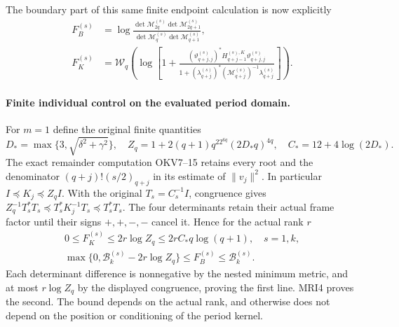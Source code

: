 \documentclass[11pt,a4paper]{article}
\begin{document}
The boundary part of this same finite endpoint calculation is
now explicitly
\[
\begin{split}
 F_B^{(s)}
 &=\log\frac{\det\mathcal M_{2q}^{(s)}
                  \det\mathcal M_{2q+1}^{(s)}}
                 {\det\mathcal M_q^{(s)}
                  \det\mathcal M_{q+1}^{(s)}},\\
 F_K^{(s)}
 &=\mathcal W_q\left(\log\left[1+
       \frac{(\vartheta_{q+j,j}^{(s)})^*
                H_{q+j-1}^{(s),K}\vartheta_{q+j,j}^{(s)}}
            {1+(\lambda_{q+j}^{(s)})^*
                (\mathcal M_{q+j}^{(s)})^{-1}\lambda_{q+j}^{(s)}}
                                    \right]\right).
\end{split}\tag{MRI4a}
\]

\paragraph{Finite individual control on the evaluated period domain.}
For $m=1$ define the original finite quantities
\[
 D_*=\max\{3,\sqrt{\delta^2+\gamma^2}\},\quad
 Z_q=1+2(q+1)q^22^{6q}(2D_*q)^{4q},\quad
 C_*=12+4\log(2D_*).
\]
The exact remainder computation OKV7--15 retains every root
and the denominator $(q+j)!(s/2)_{q+j}$ in its estimate of
$\|v_j\|^2$. In particular $I\preceq K_j\preceq Z_qI$.
With the original $T_s=C_s^{-1}I$, congruence gives
$Z_q^{-1}T_s^*T_s\preceq T_s^*K_j^{-1}T_s\preceq T_s^*T_s$.
The four determinants retain their actual frame factor until
their signs $+,+,-,-$ cancel it. Hence for the actual rank $r$
\[
\begin{gathered}
 0\le F_K^{(s)}\le2r\log Z_q\le2rC_*q\log(q+1),\quad s=1,k,\\
 \max\{0,\mathcal B_k^{(s)}-2r\log Z_q\}
             \le F_B^{(s)}\le\mathcal B_k^{(s)}.
\end{gathered}\tag{MRI4b}
\]
Each determinant difference is nonnegative by the nested
minimum metric, and at most $r\log Z_q$ by the displayed
congruence, proving the first line. MRI4 proves the second.
The bound depends on the actual rank, and otherwise does not
depend on the position or conditioning of the period kernel.
\end{document}
